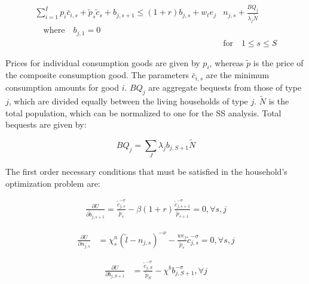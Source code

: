 \documentclass[letterpaper,12pt]{article}
\theoremstyle{definition}
\begin{document}
\begin{spacing}{1.5}
     \begin{equation}\label{EqBC}
      \begin{split}
        \sum_{i=1}^{I} p_{i}\bar{c}_{i,s} + \tilde{p}_{s}\tilde{c}_{s} + b_{j,s+1} \leq \left(1 + r\right) b_{j,s} + w_t e_{j}&n_{j,s} + \frac{BQ_{j}}{\lambda_j\tilde{N}} \\
        \quad\text{where}\quad b_{j,1} = 0 \\
        &\text{for} \quad 1\leq s \leq S 
      \end{split}
    \end{equation}
    
  Prices for individual consumption goods are given by $p_{i}$, whereas $\tilde{p}$ is the price of the composite consumption good.  The parameters $\bar{c}_{i,s}$ are the minimum consumption amounts for good $i$.  $BQ_{j}$ are aggregate bequests from those of type $j$, which are divided equally between the living households of type $j$.  $\tilde{N}$ is the total population, which can be normalized to one for the SS analysis.  Total bequests are given by:
  
  \begin{equation}
  BQ_{j} = \sum_{J} \lambda_{j}b_{j,S+1}\tilde{N}
  \end{equation}
  
 The first order necessary conditions that must be satisfied in the household's optimization problem are:
  
      \begin{equation}\label{Eqbfoc}
      \begin{split}
     \frac{\partial U}{\partial \tilde{b}_{j,s+1}}  = \frac{\tilde{c}_{j,s}^{-\sigma}}{\tilde{p}_{s}} - \beta (1+r) \frac{\tilde{c}_{j,s+1}^{-\sigma}}{\tilde{p}_{s+1}}  = 0, \forall s, j
        \end{split}
    \end{equation}

    \begin{equation}\label{Eqnfoc}
      \begin{split}
      \frac{\partial U}{\partial n_{j,s}} & =  \chi^n_{s}\left(\tilde{l}-n_{j,s}\right)^{-\nu} - \frac{we_{j}}{\tilde{p}_{s}}\tilde{c}_{j,s}^{-\sigma} = 0, \forall s, j       
      \end{split}
    \end{equation}

    \begin{equation}\label{Eqbqfoc}
      \begin{split}
      \frac{\partial U}{\partial b_{j,S+1}} & = \frac{\tilde{c}_{j,S}^{-\sigma}}{\tilde{p}_{S}} -  \chi^{b} b_{j,S+1}^{-\sigma}, \forall j
      \end{split}
    \end{equation}
  

\end{spacing}
\end{document}
